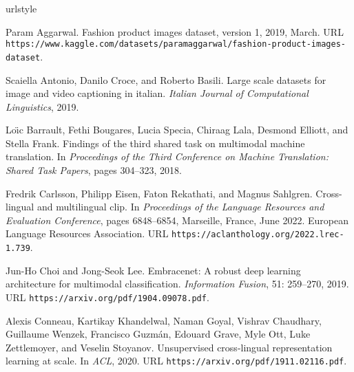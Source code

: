 \documentclass{bmvc2k}
\begin{document}
\newpage
\begin{thebibliography}{63}
\providecommand{\natexlab}[1]{#1}
\providecommand{\url}[1]{\texttt{#1}}
\expandafter\ifx\csname urlstyle\endcsname\relax
  \providecommand{\doi}[1]{doi: #1}\else
  \providecommand{\doi}{doi: \begingroup \urlstyle{rm}\Url}\fi

Param Aggarwal.
\newblock Fashion product images dataset, version 1, 2019, March.
\newblock URL
  \url{https://www.kaggle.com/datasets/paramaggarwal/fashion-product-images-dataset}.

Scaiella Antonio, Danilo Croce, and Roberto Basili.
\newblock Large scale datasets for image and video captioning in italian.
\newblock \emph{Italian Journal of Computational Linguistics}, 2019.

Lo{\"\i}c Barrault, Fethi Bougares, Lucia Specia, Chiraag Lala, Desmond
  Elliott, and Stella Frank.
\newblock Findings of the third shared task on multimodal machine translation.
\newblock In \emph{Proceedings of the Third Conference on Machine Translation:
  Shared Task Papers}, pages 304--323, 2018.

Fredrik Carlsson, Philipp Eisen, Faton Rekathati, and Magnus Sahlgren.
\newblock Cross-lingual and multilingual clip.
\newblock In \emph{Proceedings of the Language Resources and Evaluation
  Conference}, pages 6848--6854, Marseille, France, June 2022. European
  Language Resources Association.
\newblock URL \url{https://aclanthology.org/2022.lrec-1.739}.

Jun-Ho Choi and Jong-Seok Lee.
\newblock Embracenet: A robust deep learning architecture for multimodal
  classification.
\newblock \emph{Information Fusion}, 51: 259--270, 2019.
\newblock URL \url{https://arxiv.org/pdf/1904.09078.pdf}.

Alexis Conneau, Kartikay Khandelwal, Naman Goyal, Vishrav Chaudhary, Guillaume
  Wenzek, Francisco Guzm{\'a}n, Edouard Grave, Myle Ott, Luke Zettlemoyer, and
  Veselin Stoyanov.
\newblock Unsupervised cross-lingual representation learning at scale.
\newblock In \emph{ACL}, 2020.
\newblock URL \url{https://arxiv.org/pdf/1911.02116.pdf}.


\end{thebibliography}
\end{document}
